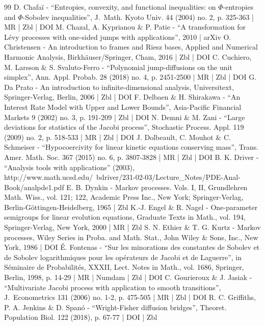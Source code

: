 \begin{thebibliography}{99}
D. Chafaï - “Entropies, convexity, and functional inequalities: on $\Phi $-entropies and $\Phi $-Sobolev inequalities”, J. Math. Kyoto Univ. 44 (2004) no. 2, p. 325-363 | MR | Zbl | DOI
M. Chazal, A. Kyprianou \& P. Patie - “A transformation for Lévy processes with one-sided jumps with applications”, 2010 | arXiv
O. Christensen - An introduction to frames and Riesz bases, Applied and Numerical Harmonic Analysis, Birkhäuser/Springer, Cham, 2016 | Zbl | DOI
C. Cuchiero, M. Larsson \& S. Svaluto-Ferro - “Polynomial jump-diffusions on the unit simplex”, Ann. Appl. Probab. 28 (2018) no. 4, p. 2451-2500 | MR | Zbl | DOI
G. Da Prato - An introduction to infinite-dimensional analysis, Universitext, Springer-Verlag, Berlin, 2006 | Zbl | DOI
F. Delbaen \& H. Shirakawa - “An Interest Rate Model with Upper and Lower Bounds”, Asia-Pacific Financial Markets 9 (2002) no. 3, p. 191-209 | Zbl | DOI
N. Demni \& M. Zani - “Large deviations for statistics of the Jacobi process”, Stochastic Process. Appl. 119 (2009) no. 2, p. 518-533 | MR | Zbl | DOI
J. Dolbeault, C. Mouhot \& C. Schmeiser - “Hypocoercivity for linear kinetic equations conserving mass”, Trans. Amer. Math. Soc. 367 (2015) no. 6, p. 3807-3828 | MR | Zbl | DOI
B. K. Driver - “Analysis tools with applications” (2003), http://www.math.ucsd.edu/~bdriver/231-02-03/Lecture\_Notes/PDE-Anal-Book/analpde1.pdf
E. B. Dynkin - Markov processes. Vols. I, II, Grundlehren Math. Wiss., vol. 121; 122, Academic Press Inc., New York; Springer-Verlag, Berlin-Göttingen-Heidelberg, 1965 | Zbl
K.-J. Engel \& R. Nagel - One-parameter semigroups for linear evolution equations, Graduate Texts in Math., vol. 194, Springer-Verlag, New York, 2000 | MR | Zbl
S. N. Ethier \& T. G. Kurtz - Markov processes, Wiley Series in Proba. and Math. Stat., John Wiley \& Sons, Inc., New York, 1986 | DOI
É. Fontenas - “Sur les minorations des constantes de Sobolev et de Sobolev logarithmiques pour les opérateurs de Jacobi et de Laguerre”, in Séminaire de Probabilités, XXXII, Lect. Notes in Math., vol. 1686, Springer, Berlin, 1998, p. 14-29 | MR | Numdam | Zbl | DOI
C. Gourieroux \& J. Jasiak - “Multivariate Jacobi process with application to smooth transitions”, J. Econometrics 131 (2006) no. 1-2, p. 475-505 | MR | Zbl | DOI
R. C. Griffiths, P. A. Jenkins \& D. Spanó - “Wright-Fisher diffusion bridges”, Theoret. Population Biol. 122 (2018), p. 67-77 | DOI | Zbl

\end{thebibliography}
